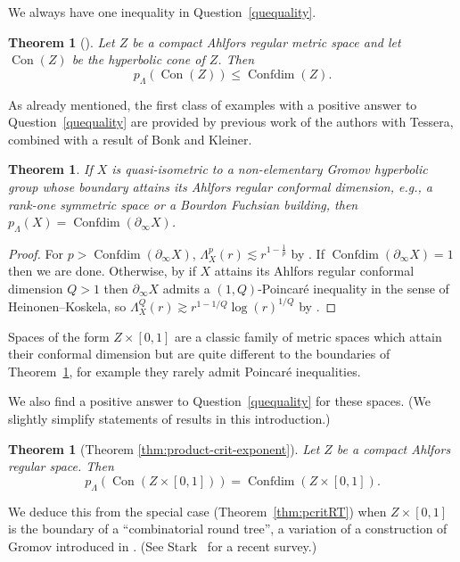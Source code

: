 \documentclass[11pt]{amsart}
\numberwithin{equation}{section}
\newtheorem{theorem}[equation]{Theorem}
\theoremstyle{citing}
\DeclareMathOperator{\Cone}{Con}
\DeclareMathOperator{\Confdim}{Confdim}
\newcommand{\bdry}{\partial_\infty}
\newcommand{\pcrit}{p_{\Lambda}}
\numberwithin{equation}{section}
\begin{document}
We always have one inequality in Question~\ref{quequality}.
\begin{theorem}[{\cite[Theorem 5.16]{HumeMackTess-PprofLie}}]\label{thm:crit-exponent-previous-upper-bound}
    Let $Z$ be a compact Ahlfors regular metric space and let $\Cone(Z)$ be the hyperbolic cone of $Z$. Then
    \[
        \pcrit(\Cone(Z)) \leq \Confdim(Z).
    \]
\end{theorem}

As already mentioned, the first class of examples with a positive answer to Question~\ref{quequality} are provided by previous work of the authors with Tessera, combined with a result of Bonk and Kleiner. 

\begin{theorem}\label{thm:hyp-attain-confdim-critexp}
    If $X$ is quasi-isometric to a non-elementary Gromov hyperbolic group whose boundary attains its Ahlfors regular conformal dimension, e.g., a rank-one symmetric space or a Bourdon Fuchsian building, then $\pcrit(X) = \Confdim(\bdry X)$.  
\end{theorem}
    
\begin{proof}
	For $p > \Confdim(\bdry X)$, $\Lambda^p_X(r) \lesssim r^{1-\frac{1}{p}}$ by \cite[Theorem 6.1]{HumeMackTess-PprofLie}.
    If $\Confdim(\bdry X)=1$ then we are done.
	Otherwise, by \cite[Theorem 1.3]{BK-05-cdim-cannon} if $X$ attains its Ahlfors regular conformal dimension $Q>1$ then $\bdry X$ admits a $(1,Q)$-Poincar\'e inequality in the sense of Heinonen--Koskela, so 
	$\Lambda^Q_X(r) \gtrsim r^{1-1/Q}\log(r)^{1/Q}$ by \cite[Theorem 11.3]{HumeMackTess-Pprof}.
\end{proof}

Spaces of the form $Z \times [0,1]$ are a classic family of metric spaces which attain their conformal dimension but are quite different to the boundaries of Theorem~\ref{thm:hyp-attain-confdim-critexp}, for example they rarely admit Poincar\'e inequalities.

We also find a positive answer to Question~\ref{quequality} for these spaces.
(We slightly simplify statements of results in this introduction.)
\begin{theorem}[Theorem \ref{thm:product-crit-exponent}]
	\label{thm:product-crit-exponent-intro}
    Let $Z$ be a compact Ahlfors regular space.
	Then
    \[
    \pcrit(\Cone(Z\times [0,1])) = \Confdim(Z\times[0,1]).
    \]
\end{theorem}
We deduce this from the special case (Theorem~\ref{thm:pcritRT}) when $Z \times [0,1]$ is the boundary of a ``combinatorial round tree'', a variation of a construction of Gromov introduced in \cite{Mac-12-random-cdim}.  
(See Stark~\cite{Stark-25-round-tree-survey} for a recent survey.)
\end{document}
